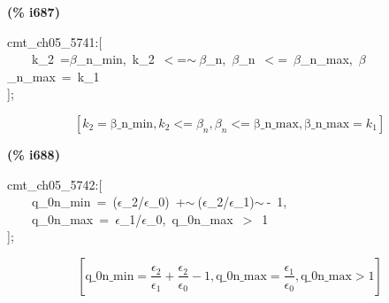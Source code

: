 \documentclass[fleqn]{article}
\begin{document}
\noindent
\begin{minipage}[t]{4.000000em}\color{red}\bfseries
(\% i687)	
\end{minipage}
\begin{minipage}[t]{\textwidth}\color{blue}
cmt\_ch05\_5741:[\\
\ \ \ \ k\_2\ =\ensuremath{\beta}\_n\_min,\ k\_2\ \ensuremath{<}=\ensuremath{\sim\ }\ensuremath{\beta}\_n,\ \ensuremath{\beta}\_n\ \ensuremath{<}=\ \ensuremath{\beta}\_n\_max,\ \ensuremath{\beta}\_n\_max\ =\ k\_1\\
];
\end{minipage}
\[\displaystyle \tag{\% o687} 
\left[ {k_2}=\ensuremath{\mathrm{\beta \_ n\_ min}}\operatorname{,}{k_2}\operatorname{<  =}{{\beta }_n}\operatorname{,}{{\beta }_n}\operatorname{<  =}\ensuremath{\mathrm{\beta \_ n\_ max}}\operatorname{,}\ensuremath{\mathrm{\beta \_ n\_ max}}={k_1}\right] \mbox{}
\]


\noindent
\begin{minipage}[t]{4.000000em}\color{red}\bfseries
(\% i688)	
\end{minipage}
\begin{minipage}[t]{\textwidth}\color{blue}
cmt\_ch05\_5742:[\\
\ \ \ \ q\_0n\_min\ =\ (\ensuremath{\epsilon}\_2/\ensuremath{\epsilon}\_0)\ +\ensuremath{\sim\ }(\ensuremath{\epsilon}\_2/\ensuremath{\epsilon}\_1)\ensuremath{\sim\ }-\ 1,\\
\ \ \ \ q\_0n\_max\ =\ \ensuremath{\epsilon}\_1/\ensuremath{\epsilon}\_0,\ q\_0n\_max\ \ensuremath{>}\ 1\\
];
\end{minipage}
\[\displaystyle \tag{\% o688} 
\left[ \ensuremath{\mathrm{q\_ 0n\_ min}}=\frac{{{\epsilon }_2}}{{{\epsilon }_1}}+\frac{{{\epsilon }_2}}{{{\epsilon }_0}}-1\operatorname{,}\ensuremath{\mathrm{q\_ 0n\_ max}}=\frac{{{\epsilon }_1}}{{{\epsilon }_0}}\operatorname{,}\ensuremath{\mathrm{q\_ 0n\_ max}}\operatorname{>  }1\right] \mbox{}
\]
\end{document}
